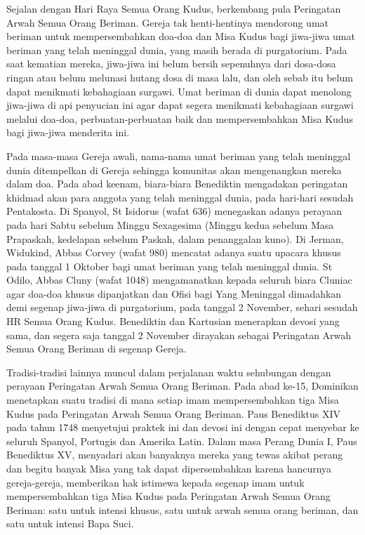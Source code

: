 Sejalan dengan Hari Raya Semua Orang Kudus, berkembang pula Peringatan Arwah Semua Orang Beriman. Gereja tak henti-hentinya mendorong umat beriman untuk mempersembahkan doa-doa dan Misa Kudus bagi jiwa-jiwa umat beriman yang telah meninggal dunia, yang masih berada di purgatorium. Pada saat kematian mereka, jiwa-jiwa ini belum bersih sepenuhnya dari dosa-dosa ringan atau belum melunasi hutang dosa di masa lalu, dan oleh sebab itu belum dapat menikmati kebahagiaan surgawi. Umat beriman di dunia dapat menolong jiwa-jiwa di api penyucian ini agar dapat segera menikmati kebahagiaan surgawi melalui doa-doa, perbuatan-perbuatan baik dan mempersembahkan Misa Kudus bagi jiwa-jiwa menderita ini.

Pada masa-masa Gereja awali, nama-nama umat beriman yang telah meninggal dunia ditempelkan di Gereja sehingga komunitas akan mengenangkan mereka dalam doa. Pada abad keenam, biara-biara Benediktin mengadakan peringatan khidmad akan para anggota yang telah meninggal dunia, pada hari-hari sesudah Pentakosta. Di Spanyol, St Isidorus (wafat 636) menegaskan adanya perayaan pada hari Sabtu sebelum Minggu Sexagesima (Minggu kedua sebelum Masa Prapaskah, kedelapan sebelum Paskah, dalam penanggalan kuno). Di Jerman, Widukind, Abbas Corvey (wafat 980) mencatat adanya suatu upacara khusus pada tanggal 1 Oktober bagi umat beriman yang telah meninggal dunia. St Odilo, Abbas Cluny (wafat 1048) mengamanatkan kepada seluruh biara Cluniac agar doa-doa khusus dipanjatkan dan Ofisi bagi Yang Meninggal dimadahkan demi segenap jiwa-jiwa di purgatorium, pada tanggal 2 November, sehari sesudah HR Semua Orang Kudus. Benediktin dan Kartusian menerapkan devosi yang sama, dan segera saja tanggal 2 November dirayakan sebagai Peringatan Arwah Semua Orang Beriman di segenap Gereja.

Tradisi-tradisi lainnya muncul dalam perjalanan waktu sehubungan dengan perayaan Peringatan Arwah Semua Orang Beriman. Pada abad ke-15, Dominikan menetapkan suatu tradisi di mana setiap imam mempersembahkan tiga Misa Kudus pada Peringatan Arwah Semua Orang Beriman. Paus Benediktus XIV pada tahun 1748 menyetujui praktek ini dan devosi ini dengan cepat menyebar ke seluruh Spanyol, Portugis dan Amerika Latin. Dalam masa Perang Dunia I, Paus Benediktus XV, menyadari akan banyaknya mereka yang tewas akibat perang dan begitu banyak Misa yang tak dapat dipersembahkan karena hancurnya gereja-gereja, memberikan hak istimewa kepada segenap imam untuk mempersembahkan tiga Misa Kudus pada Peringatan Arwah Semua Orang Beriman: satu untuk intensi khusus, satu untuk arwah semua orang beriman, dan satu untuk intensi Bapa Suci.

